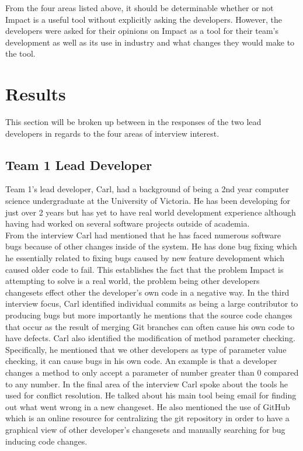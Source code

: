 \documentclass[conference]{IEEEtran}
\begin{document}
From the four areas listed above, it should be determinable whether or not Impact is a useful tool
without explicitly asking the developers. However, the developers were asked for their opinions 
on Impact as a tool for their team's development as well as its use in industry and what changes
they would make to the tool. \\


\section{Results}
This section will be broken up between in the responses of the two lead developers in regards to
the four areas of interview interest.

\subsection{Team 1 Lead Developer}
Team 1's lead developer, Carl, had a background of being a 2nd year computer science undergraduate
at the University of Victoria. He has been developing for just over 2 years but has yet to have real world
development experience although having had worked on several software projects outside of academia. \\

From the interview Carl had mentioned that he has faced numerous software bugs because of other changes
inside of the system. He has done bug fixing which he essentially related to fixing bugs caused by new
feature development which caused older code to fail. This establishes the fact that the problem Impact
is attempting to solve is a real world, the problem being other developers changesets effect other the
developer's own code in a negative way. In the third interview focus, Carl identified individual commits
as being a large contributor to producing bugs but more importantly he mentions that the source code
changes that occur as the result of merging Git branches can often cause his own code to have defects.
Carl also identified the modification of method parameter checking. Specifically, he mentioned that we
other developers as type of parameter value checking, it can cause bugs in his own code. An example is
that a developer changes a method to only accept a parameter of number greater than 0 compared to any
number. In the final area of the interview Carl spoke about the tools he used for conflict resolution. He
talked about his main tool being email for finding out what went wrong in a new changeset. He also
mentioned the use of GitHub which is an online resource for centralizing the git repository in order
to have a graphical view of other developer's changesets and manually searching for bug inducing 
code changes.\\ 
\end{document}
